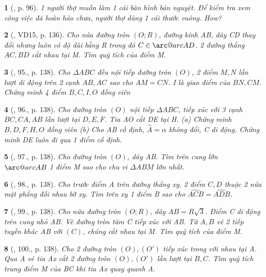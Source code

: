 \documentclass{article}
\makeatletter
\newcommand{\arc@char}{{\usefont{U}{tipa}{m}{n}\symbol{62}}}%
\newcommand{\arc}[1]{\mathpalette\arc@arc{#1}}
\newcommand{\arc@arc}[2]{%
	\sbox0{$\m@th#1#2$}%
	\vbox{
		\hbox{\resizebox{\wd0}{\height}{\arc@char}}
		\nointerlineskip
		\box0
	}%
}
\newtheorem{baitoan}{}
\makeatother
\begin{document}
\begin{baitoan}[\cite{Binh_boi_duong_Toan_9_tap_2}, p. 96]
	1 người thợ muốn làm 1 cái bàn hình bán nguyệt. Để kiểm tra xem công việc đã hoàn hảo chưa, người thợ dùng 1 cái thước vuông. How?
\end{baitoan}

\begin{baitoan}[\cite{Tuyen_Toan_9_old}, VD15, p. 136]
	Cho nửa đường tròn $(O;R)$, đường kính AB, dây CD thay đổi nhưng luôn có độ dài bằng R trong đó $C\in\arc{AD}$. 2 đường thẳng $AC,BD$ cắt nhau tại M. Tìm quỹ tích của điểm M.
\end{baitoan}

\begin{baitoan}[\cite{Tuyen_Toan_9_old}, 95., p. 138]
	Cho $\Delta ABC$ đều nội tiếp đường tròn $(O)$, 2 điểm $M,N$ lần lượt di động trên 2 cạnh $AB,AC$ sao cho $AM = CN$. I là giao điểm của $BN,CM$. Chứng minh 4 điểm $B,C,I,O$ đồng viên
\end{baitoan}

\begin{baitoan}[\cite{Tuyen_Toan_9_old}, 96., p. 138]
	Cho đường tròn $(O)$ nội tiếp $\Delta ABC$, tiếp xúc với 3 cạnh $BC,CA,AB$ lần lượt tại $D,E,F$. Tia AO cắt DE tại H. (a) Chứng minh $B,D,F,H,O$ đồng viên (b) Cho AB cố định, $\widehat{A} = \alpha$ không đổi, C di động. Chứng minh DE luôn đi qua 1 điểm cố định.
\end{baitoan}

\begin{baitoan}[\cite{Tuyen_Toan_9_old}, 97., p. 138]
	Cho đường tròn $(O)$, dây AB. Tìm trên cung lớn $\arc{AB}$ 1 điểm M sao cho chu vi $\Delta ABM$ lớn nhất.
\end{baitoan}

\begin{baitoan}[\cite{Tuyen_Toan_9_old}, 98., p. 138]
	Cho trước điểm A trên đường thẳng xy, 2 điểm $C,D$ thuộc 2 nửa mặt phẳng đối nhau bờ xy. Tìm trên xy 1 điểm B sao cho $\widehat{ACB} = \widehat{ADB}$.
\end{baitoan}

\begin{baitoan}[\cite{Tuyen_Toan_9_old}, 99., p. 138]
	Cho nửa đường tròn $(O;R)$, dây $AB = R\sqrt{3}$. Điểm C di động trên cung nhỏ AB. Vẽ đường tròn tâm C tiếp xúc với AB. Từ $A,B$ vẽ 2 tiếp tuyến khác AB với $(C)$, chúng cắt nhau tại M. Tìm quỹ tích của điểm M.
\end{baitoan}

\begin{baitoan}[\cite{Tuyen_Toan_9_old}, 100., p. 138]
	Cho 2 đường tròn $(O),(O')$ tiếp xúc trong với nhau tại A. Qua A vẽ tia Ax cắt 2 đường tròn $(O),(O')$ lần lượt tại $B,C$. Tìm quỹ tích trung điểm M của BC khi tia Ax quay quanh A.
\end{baitoan}
\end{document}

